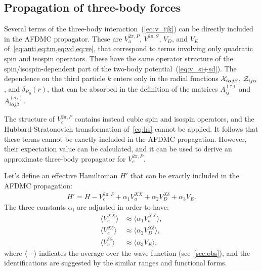 \documentclass[aps,prc,twocolumn,superscriptaddress,floatfix]{revtex4-1}
\begin{document}
\subsection{Propagation of three-body forces}
\label{sec:p3}
Several terms of the three-body interaction~(\ref{eq:v_ijk}) can be directly included in the AFDMC propagator. 
These are $V_a^{2\pi,P}$, $V^{2\pi,S}$, $V_D$, and $V_E$ of~\cref{eq:anti,eq:tm,eq:vd,eq:ve},
that correspond to terms involving only quadratic spin and isospin operators.
These have the same operator structure of the spin/isospin-dependent part of the
two-body potential~(\ref{eq:v_si+sd}). The dependence on the third particle $k$ enters only in the radial
functions ${\cal X}_{i\alpha j\beta}$, ${\cal Z}_{ij\alpha}$, and $\delta_{R_0}(r)$,
that can be absorbed in the definition of the
matrices $A^{(\tau)}_{ij}$ and $A^{(\sigma\tau)}_{i\alpha j\beta}$.

The structure of $V_c^{2\pi,P}$ contains instead cubic spin and isospin operators, 
and the Hubbard-Stratonovich transformation of~\cref{eq:hs} cannot be applied.
It follows that these terms cannot be exactly included in the AFDMC propagation.
However, their expectation value can be calculated, and it can be used to derive
an approximate three-body propagator for $V_c^{2\pi,P}$.

Let's define an effective Hamiltonian $H'$ that can be exactly included in 
the AFDMC propagation:
\begin{align}
H'=H-V_c^{2\pi,P}+\alpha_1 V_a^{XX}+\alpha_2 V_D^{X\delta}+\alpha_3 V_E .
\label{eq:h'}
\end{align}
The three constants $\alpha_i$ are adjusted in order to have:
\begin{align}
\langle V_c^{XX}\rangle & \approx\langle\alpha_1 V_a^{XX}\rangle , \nonumber \\
\langle V_c^{X\delta}\rangle & \approx\langle\alpha_2 V_D^{X\delta}\rangle , \nonumber  \\
\langle V_c^{\delta\delta}\rangle & \approx\langle\alpha_3 V_E\rangle , 
\label{eq:pert}
\end{align}
where $\langle\,\cdots\rangle$ indicates the average over the wave function
(see~\cref{sec:obs}), and the identifications are suggested by the similar 
ranges and functional forms.
\end{document}
